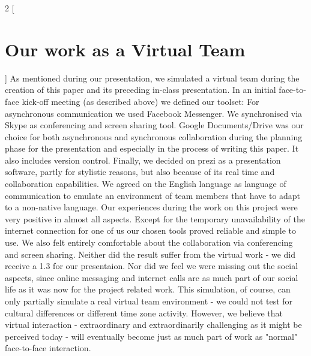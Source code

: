 \begin{multicols}{2}
[\section{Our work as a Virtual Team}]
As mentioned during our presentation, we simulated a virtual team during the creation of this paper and its preceding in-class presentation. In an initial face-to-face kick-off meeting (as described above) we defined our toolset: For asynchronous communication we used Facebook Messenger. We synchronised via Skype as conferencing and screen sharing tool. Google Documents/Drive was our choice for both asynchronous and synchronous collaboration during the planning phase for the presentation and especially in the process of writing this paper. It also includes version control. Finally, we decided on prezi as a presentation software, partly for stylistic reasons, but also because of its real time and collaboration capabilities. We agreed on the English language as language of communication to emulate an environment of team members that have to adapt to a non-native language.
Our experiences during the work on this project were very positive in almost all aspects. Except for the temporary unavailability of the internet connection for one of us our chosen tools proved reliable and simple to use. We also felt entirely comfortable about the collaboration via conferencing and screen sharing. Neither did the result suffer from the virtual work - we did receive a 1.3 for our presentaion. Nor did we feel we were missing out the social aspects, since online messaging and internet calls are as much part of our social life as it was now for the project related work.
This simulation, of course, can only partially simulate a real virtual team environment - we could not test for cultural differences or different time zone activity. However, we believe that virtual interaction - extraordinary and extraordinarily challenging as it might be perceived today - will eventually become just as much part of work as "normal" face-to-face interaction.
\end{multicols}